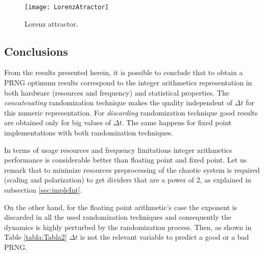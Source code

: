 \begin{figure}
    \centering
    \texttt{[image: LorenzAtractor]}\\
    \caption{Lorenz attractor.}\label{fig:atractor}
\end{figure}

\subsection{Conclusions}
\label{sec:conclusions} From the results presented herein, it is
possible to conclude that to obtain a PRNG optimum results
correspond to the integer arithmetics representation in both
hardware (resources and frequency) and statistical properties. The
\textit{concatenating} randomization technique makes the quality
independent of $\Delta t$ for this numeric representation.  For
\textit{discarding} randomization technique good results are
obtained  only for big values of $\Delta t$. The same happens for
fixed point implementations with both randomization techniques.

In terms of usage resources and frequency limitations integer
arithmetics performance is considerable better than floating point
and fixed point. Let us remark that to minimize resources
preprocessing of the chaotic system is required (scaling and
polarization) to get dividers that are a power of $2$, as
explained in subsection  \ref{sec:impleInt}.

On the other hand, for the floating point arithmetic's case  the
exponent is discarded in all the used randomization techniques and
consequently the dynamics is highly perturbed by the randomization
process. Then, as shown in Table \ref{tabla:Tabla2} $\Delta t$ is
not the relevant variable to predict a good or a bad PRNG.